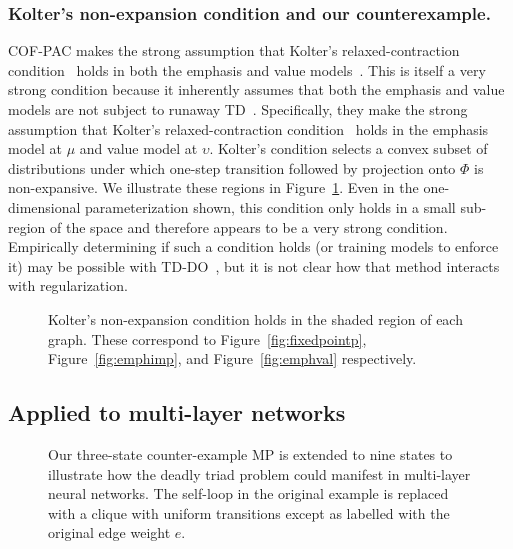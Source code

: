 \subsubsection{Kolter's non-expansion condition and our counterexample. }
COF-PAC makes the strong assumption that Kolter's relaxed-contraction condition~\cite[eqn.~10]{kolter2011fixed} holds in both the emphasis and value models~\cite[asm.~4]{zhang2020provably}. This is itself a very strong condition because it inherently assumes that both the emphasis and value models are not subject to runaway TD~\cite[asm.~4]{zhang2020provably}. Specifically, they make the strong assumption that Kolter's relaxed-contraction condition~\cite[eqn.~10]{kolter2011fixed} holds in the emphasis model at $\mu$ and value model at $\upsilon$. Kolter's condition selects a convex subset of distributions under which one-step transition followed by projection onto $\Phi$ is non-expansive. We illustrate these regions in Figure~\ref{fig:koldercond}. Even in the one-dimensional parameterization shown, this condition only holds in a small sub-region of the space and therefore appears to be a very strong condition. Empirically determining if such a condition holds (or training models to enforce it) may be possible with TD-DO~\cite[sec~4.1]{kolter2011fixed}, but it is not clear how that method interacts with regularization.~\label{sec:nosingularity}

\begin{figure}
	\centering
	
	\caption{Kolter's non-expansion condition holds in the shaded region of each graph. These correspond to Figure~\ref{fig:fixedpointp}, Figure~\ref{fig:emphimp}, and Figure~\ref{fig:emphval} respectively. }
	\label{fig:koldercond}
\end{figure}


\subsection{Applied to multi-layer networks}
\label{sec:multilayer}


\begin{figure}
	
	\caption{Our three-state counter-example MP is extended to nine states to illustrate how the deadly triad problem could manifest in multi-layer neural networks. The self-loop in the original example is replaced with a clique with uniform transitions except as labelled with the original edge weight $e$. }
	\label{fig:mdp9_illustration}
\end{figure}


